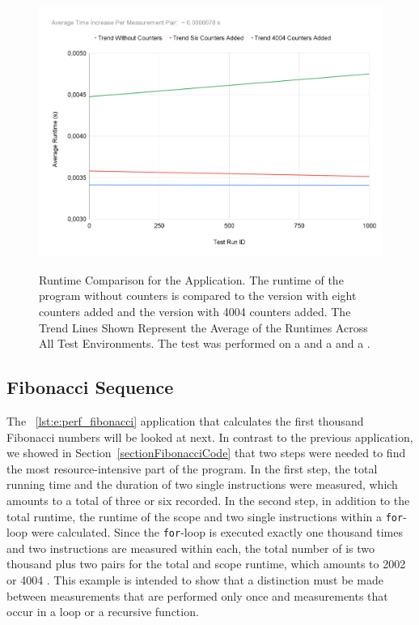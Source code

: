 \begin{figure}[t]
  \centering
  \caption[Runtime Comparison for the \FIBONACCI Application.]{Runtime Comparison for the \FIBONACCI Application. The runtime of the program without counters is compared to the version with eight counters added and the version with 4004 counters added. The Trend Lines Shown Represent the Average of the Runtimes Across All Test Environments. The test was performed on a \IMAC and a \MACBOOK and a \AMD.} 
  \includegraphics[width=1\textwidth]{graphics/e_fibonacci_comparison.png}
  \label{fig:e:fibonacci_comparison}
\end{figure}

\subsection{Fibonacci Sequence}
The \FIBONACCI~\ref{lst:e:perf_fibonacci} application that calculates the first thousand Fibonacci numbers will be looked at next. In contrast to the previous application, we showed in Section~\ref{sectionFibonacciCode} that two steps were needed to find the most resource-intensive part of the program. In the first step, the total running time and the duration of two single instructions were measured, which amounts to a total of three \MEASUREPAIRS or six \MEASUREVALUES recorded. In the second step, in addition to the total runtime, the runtime of the scope and two single instructions within a \lstinline{for}-loop were calculated. Since the \lstinline{for}-loop is executed exactly one thousand times and two instructions are measured within each, the total number of \MEASUREPAIRS is two thousand plus two pairs for the total and scope runtime, which amounts to 2002 \MEASUREPAIRS or 4004 \MEASUREVALUES. This example is intended to show that a distinction must be made between measurements that are performed only once and measurements that occur in a loop or a recursive function.

